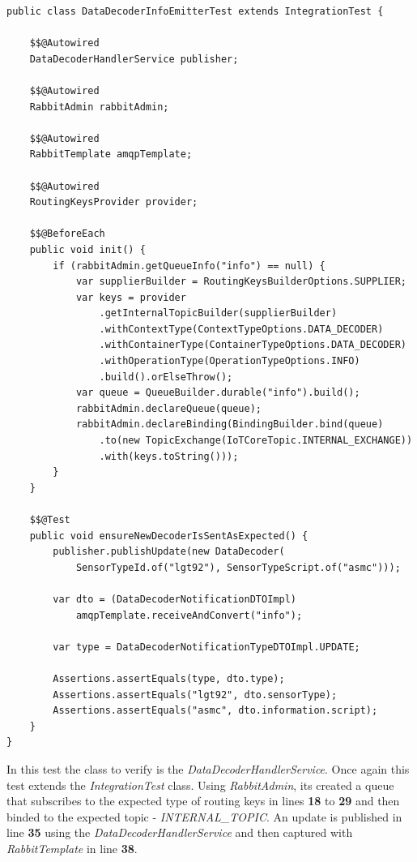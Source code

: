 \begin{lstlisting}[style=Java, caption=Functional Test - Message Broker Interaction - \textbf{Data Decoder Master Backend}, label={code:implementation:tests:func4}]
public class DataDecoderInfoEmitterTest extends IntegrationTest {

    $$@Autowired
    DataDecoderHandlerService publisher;

    $$@Autowired
    RabbitAdmin rabbitAdmin;

    $$@Autowired
    RabbitTemplate amqpTemplate;

    $$@Autowired
    RoutingKeysProvider provider;

    $$@BeforeEach
    public void init() {
        if (rabbitAdmin.getQueueInfo("info") == null) {
            var supplierBuilder = RoutingKeysBuilderOptions.SUPPLIER;
            var keys = provider
                .getInternalTopicBuilder(supplierBuilder)
                .withContextType(ContextTypeOptions.DATA_DECODER)
                .withContainerType(ContainerTypeOptions.DATA_DECODER)
                .withOperationType(OperationTypeOptions.INFO)
                .build().orElseThrow();
            var queue = QueueBuilder.durable("info").build();
            rabbitAdmin.declareQueue(queue);
            rabbitAdmin.declareBinding(BindingBuilder.bind(queue)
                .to(new TopicExchange(IoTCoreTopic.INTERNAL_EXCHANGE))
                .with(keys.toString()));
        }
    }

    $$@Test
    public void ensureNewDecoderIsSentAsExpected() {
        publisher.publishUpdate(new DataDecoder(
            SensorTypeId.of("lgt92"), SensorTypeScript.of("asmc")));

        var dto = (DataDecoderNotificationDTOImpl)
            amqpTemplate.receiveAndConvert("info");

        var type = DataDecoderNotificationTypeDTOImpl.UPDATE;

        Assertions.assertEquals(type, dto.type);
        Assertions.assertEquals("lgt92", dto.sensorType);
        Assertions.assertEquals("asmc", dto.information.script);
    }
}
\end{lstlisting}

In this test the class to verify is the \textit{DataDecoderHandlerService}. Once again this test extends the \textit{IntegrationTest} class. Using \textit{RabbitAdmin}, its created a queue that subscribes to the expected type of routing keys in lines \textbf{18} to \textbf{29} and then binded to the expected topic - \textit{INTERNAL\_TOPIC}.
An update is published in line \textbf{35} using the \textit{DataDecoderHandlerService} and then captured with \textit{RabbitTemplate} in line \textbf{38}.

